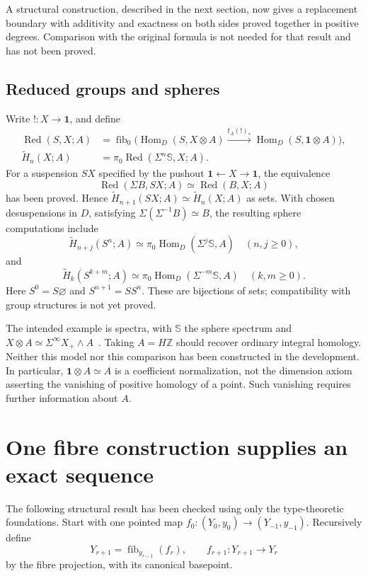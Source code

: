 \documentclass[11pt,a4paper]{amsart}
\theoremstyle{definition}
\newcommand{\Hom}{\operatorname{Hom}}
\newcommand{\fib}{\operatorname{fib}}
\newcommand{\pt}{\mathbf 1}
\newcommand{\sph}{\mathbb S}
\newcommand{\red}{\widetilde H}
\newcommand{\Red}{\operatorname{Red}}
\begin{document}
A structural construction, described in the next section, now gives a
replacement boundary with additivity and exactness on both sides proved
together in positive degrees. Comparison with the original formula is
not needed for that result and has not been proved.

\subsection*{Reduced groups and spheres}
Write $!:X\to\pt$, and define
\begin{align*}
 \Red(S,X;A)&=\fib_0\bigl(\Hom_D(S,X\otimes A)
              \xrightarrow{t_A(!)_*}\Hom_D(S,\pt\otimes A)\bigr),\\
 \red_n(X;A)&=\pi_0\Red(\Sigma^n\sph,X;A).
\end{align*}
For a suspension $SX$ specified by the pushout $\pt\leftarrow X\to\pt$,
the equivalence
\[
 \Red(\Sigma B,SX;A)\simeq\Red(B,X;A)
\]
has been proved. Hence $\red_{n+1}(SX;A)\simeq\red_n(X;A)$ as sets.
With chosen desuspensions in $D$, satisfying
$\Sigma(\Sigma^{-1}B)\simeq B$, the resulting sphere computations include
\[
 \red_{n+j}(S^n;A)\simeq\pi_0\Hom_D(\Sigma^j\sph,A)
 \quad(n,j\geq0),
\]
and
\[
 \red_k(S^{k+m};A)\simeq\pi_0\Hom_D(\Sigma^{-m}\sph,A)
 \quad(k,m\geq0).
\]
Here $S^0=S\varnothing$ and $S^{n+1}=SS^n$. These are bijections of
sets; compatibility with group structures is not yet proved.

The intended example is spectra, with $\sph$ the sphere spectrum and
$X\otimes A\simeq\Sigma^\infty X_+\wedge A$~\cite{HA}. Taking
$A=H\mathbb Z$ should recover ordinary integral homology. Neither this
model nor this comparison has been constructed in the development.
In particular, $\pt\otimes A\simeq A$ is a coefficient normalization,
not the dimension axiom asserting the vanishing of positive homology
of a point. Such vanishing requires further information about $A$.

\section{One fibre construction supplies an exact sequence}
\label{sec:fibres}

The following structural result has been checked using only the
type-theoretic foundations. Start with one pointed map
$f_0:(Y_0,y_0)\to(Y_{-1},y_{-1})$. Recursively define
\[
 Y_{r+1}=\fib_{y_{r-1}}(f_r),\qquad
 f_{r+1}:Y_{r+1}\longrightarrow Y_r
\]
by the fibre projection, with its canonical basepoint.
\end{document}
